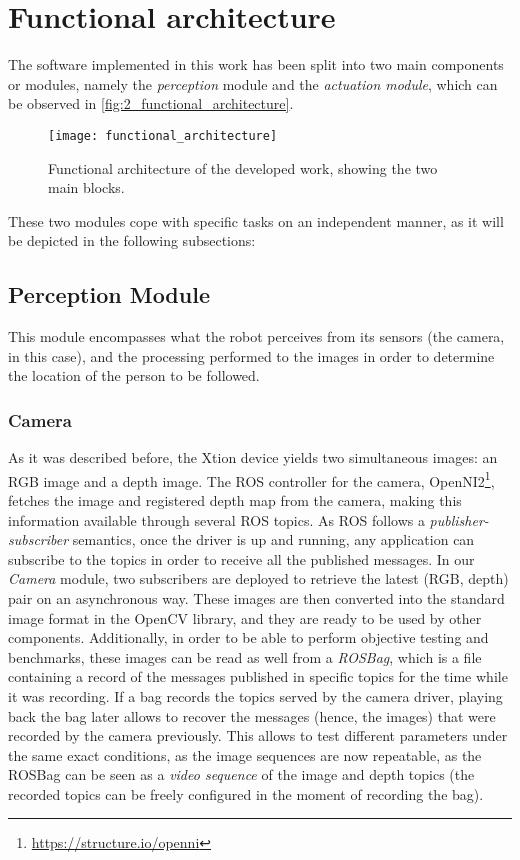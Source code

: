 \section{Functional architecture}
The software implemented in this work has been split into two main components or modules, namely the \textit{perception} module and the \textit{actuation module}, which can be observed in \autoref{fig:2_functional_architecture}.

\begin{figure}[h]
	\centering
	\texttt{[image: functional\_architecture]}
	\caption{Functional architecture of the developed work, showing the two main blocks.}
	\label{fig:2_functional_architecture}
\end{figure}

These two modules cope with specific tasks on an independent manner, as it will be depicted in the following subsections:

\subsection{Perception Module}
This module encompasses what the robot perceives from its sensors (the camera, in this case), and the processing performed to the images in order to determine the location of the person to be followed.
\subsubsection{Camera}
As it was described before, the Xtion device yields two simultaneous images: an RGB image and a depth image. The ROS controller for the camera, OpenNI2\footnote{\url{https://structure.io/openni}}, fetches the image and registered depth map from the camera, making this information available through several ROS topics. As ROS follows a \textit{publisher-subscriber} semantics, once the driver is up and running, any application can subscribe to the topics in order to receive all the published messages. In our \textit{Camera} module, two subscribers are deployed to retrieve the latest (RGB, depth) pair on an asynchronous way. These images are then converted into the standard image format in the OpenCV library, and they are ready to be used by other components. Additionally, in order to be able to perform objective testing and benchmarks, these images can be read as well from a \textit{ROSBag}, which is a file containing a record of the messages published in specific topics for the time while it was recording. If a bag records the topics served by the camera driver, playing back the bag later allows to recover the messages (hence, the images) that were recorded by the camera previously. This allows to test different parameters under the same exact conditions, as the image sequences are now repeatable, as the ROSBag can be seen as a \textit{video sequence} of the image and depth topics (the recorded topics can be freely configured in the moment of recording the bag).\\

